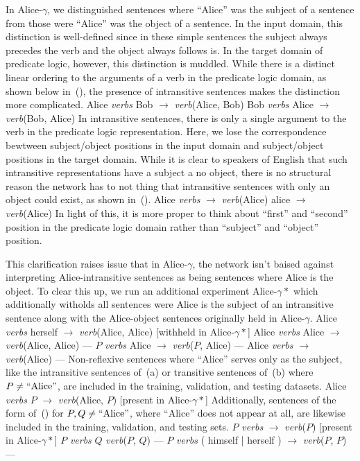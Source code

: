 In Alice-$\gamma$, we distinguished sentences where ``Alice'' was the subject
of a sentence from those were ``Alice'' was the object of a sentence. In the
input domain, this distinction is well-defined since in these simple sentences
the subject always precedes the verb and the object always follows is. In the
target domain of predicate logic, however, this distinction is muddled. While
there is a distinct linear ordering to the arguments of a verb in the predicate
logic domain, as shown below in~(\nextx), the presence of intransitive 
sentences makes the distinction more complicated.
\pex
	\a Alice {\it verbs} Bob $\to$ {\it verb}(Alice, Bob)
	\a Bob {\it verbs} Alice $\to$ {\it verb}(Bob, Alice)
\xe
In intransitive sentences, there is only a single argument to the verb in the
predicate logic representation. Here, we lose the correspondence bewtween
subject/object positions in the input domain and subject/object positions in 
the target domain. While it is clear to speakers of English that such 
intransitive representations have a subject a no object, there is no structural
reason the network has to not thing that intransitive sentences with only an
object could exist, as shown in~(\nextx).
\pex
	\a Alice {\it verbs} $\to$ {\it verb}(Alice)
	\a {} alice $\to$ {\it verb}(Alice)
\xe
In light of this, it is more proper to think about ``first'' and ``second''
position in the predicate logic domain rather than ``subject'' and ``object''
position. 

This clarification raises issue that in Alice-$\gamma$, the network isn't 
baised against interpreting Alice-intransitive sentences as being sentences
where Alice is the object. To clear this up, we run an additional experiment
Alice-$\gamma*$ which additionally witholds all sentences were Alice is the
subject of an intransitive sentence along with the Alice-object sentences
originally held in Alice-$\gamma$.
\pex
	\a Alice {\em verbs} herself $\to$ {\em verb}(Alice, Alice) \hfill [withheld in Alice-$\gamma*$]
	\a Alice {\em verbs} Alice $\to$ {\em verb}(Alice, Alice) \hfill ---
	\a $P$ {\em verbs} Alice $\to$ {\em verb}($P$, Alice) \hfill ---
	\a Alice {\em verbs} $\to$ {\em verb}(Alice) \hfill ---
\xe
Non-reflexive sentences where ``Alice'' serves only as the subject, like the
intransitive sentences of~(\nextx a) or transitive sentences of~(\nextx b) 
where $P \not= \hbox{``Alice''}$, are included in the training, validation, and
testing datasets.
\pex
	\a Alice {\em verbs} $P$ $\to$ {\em verb}(Alice, $P$) \hfill [present in Alice-$\gamma*$]
\xe
Additionally, sentences of the form of~(\nextx) for $P,Q \not= \hbox{``Alice''}$, where ``Alice'' does not appear at all, are likewise included in the
training, validation, and testing sets.
\pex
	\a $P$ {\em verbs} $\to$ {\em verb}($P$) \hfill [present in Alice-$\gamma*$]
	\a $P$ {\em verbs} $Q$ {\em verb}($P$, $Q$) \hfill ---
	\a $P$ {\em verbs} ( himself | herself ) $\to$ {\em verb}($P$, $P$) \hfill ---
\xe


